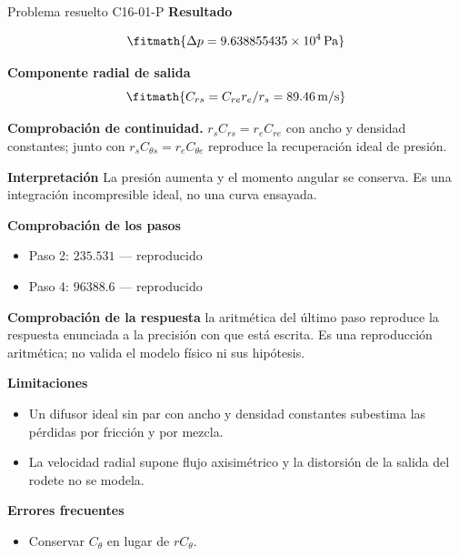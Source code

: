 \documentclass[10pt,openany]{book}
\begin{document}
\begin{studiumworked}{Problema resuelto C16-01-P}
\noindent\textbf{Resultado}

\[
\fitmath{\Delta p=9.638855435\times10^{4}\,\mathrm{Pa}}
\]

\noindent\textbf{Componente radial de salida}
\[
\fitmath{C_{rs}=C_{re}r_e/r_s=89.46\,\mathrm{m/s}}
\]

\noindent\textbf{Comprobación de continuidad.} $r_sC_{rs}=r_eC_{re}$ con ancho y densidad constantes; junto con $r_sC_{\theta s}=r_eC_{\theta e}$ reproduce la recuperación ideal de presión.

\noindent\textbf{Interpretación}
La presión aumenta y el momento angular se conserva. Es una integración incompresible ideal, no una curva ensayada.

\noindent\textbf{Comprobación de los pasos}
\begin{itemize}
\item Paso 2: $235.531$ — reproducido
\item Paso 4: $96388.6$ — reproducido
\end{itemize}

\noindent\textbf{Comprobación de la respuesta} la aritmética del último paso reproduce la respuesta enunciada a la precisión con que está escrita. Es una reproducción aritmética; no valida el modelo físico ni sus hipótesis.

\noindent\textbf{Limitaciones}
\begin{itemize}
\item Un difusor ideal sin par con ancho y densidad constantes subestima las pérdidas por fricción y por mezcla.
\item La velocidad radial supone flujo axisimétrico y la distorsión de la salida del rodete no se modela.
\end{itemize}

\noindent\textbf{Errores frecuentes}
\begin{itemize}
\item Conservar $C_\theta$ en lugar de $rC_\theta$.
\end{itemize}
\end{studiumworked}
\end{document}
